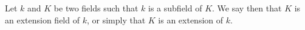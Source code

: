 Let $k$ and $K$ be two fields such that $k$ is a subfield of $K$. We say then that $K$ is an extension field of $k$, or simply that $K$ is an extension of $k$.
